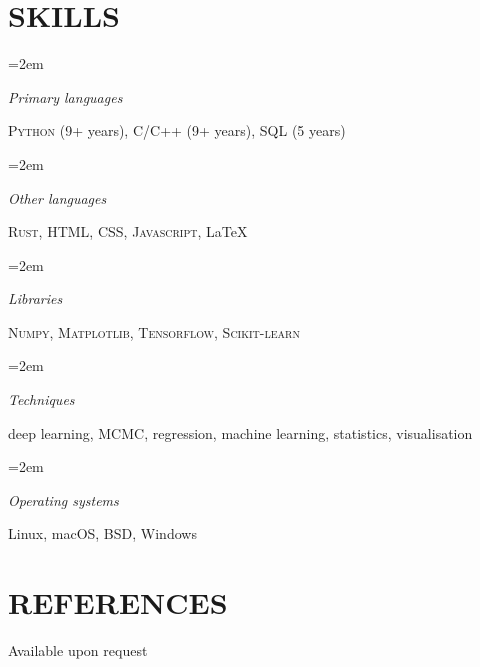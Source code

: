 \documentclass[paper=a4,fontsize=11pt]{scrartcl} %
\newlength{\spacebox}
\newlength{\skillbox}
\newcommand{\NewPart}[1]{\section*{\uppercase{#1}}}
\newcommand{\PersonalEntry}[2]{
		\noindent\hangindent=2em\hangafter=0 %
		\parbox{\spacebox}{        %
		\textit{#1}}		       %
		\hspace{1.5em} #2 \par}    %
\newcommand{\SkillsEntry}[2]{      %
		\noindent\hangindent=2em\hangafter=0 %
		\parbox{\skillbox}{        %
		\textit{#1}}			   %
		\hspace{1.5em} #2 \par}    %
\begin{document}
\NewPart{Skills}{}

\SkillsEntry{Primary \mbox{languages}}{\textsc{Python} (9+ years), \textsc{C/C++} (9+ years), \textsc{SQL} (5 years)}
\SkillsEntry{Other \mbox{languages}}{\textsc{Rust}, \textsc{HTML}, \textsc{CSS}, \textsc{Javascript}, \LaTeX}
\SkillsEntry{Libraries}{\textsc{Numpy}, \textsc{Matplotlib}, \mbox{\textsc{Tensorflow}}, \textsc{Scikit-learn}}
\SkillsEntry{Techniques}{deep learning, MCMC, regression, machine learning, statistics, visualisation}
\SkillsEntry{Operating systems}{Linux, macOS, BSD, Windows}


\NewPart{References}{}
Available upon request
\end{document}

